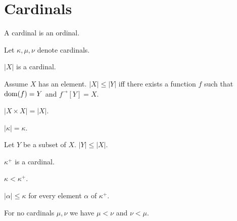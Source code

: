 \documentclass{article}
\newcommand{\Prod}[2]{#1\times #2}
\newcommand{\Succ}[1]{#1^{+}}
\newcommand{\image}[2]{#1^{\to}[#2]}
\newcommand{\card}[1]{\left|#1\right|}
\begin{document}
  \section{Cardinals}

  \begin{forthel}
    \begin{signature}
      A cardinal is an ordinal.
    \end{signature}

    Let $\kappa, \mu, \nu$ denote cardinals.
  \end{forthel}

  \begin{forthel}
    \begin{signature}[Cardinality]
      $\card{X}$ is a cardinal.
    \end{signature}

    \begin{axiom}
      Assume $X$ has an element.
      $\card{X} \leq \card{Y}$ iff
        there exists a function $f$ such that
          $\operatorname{dom}(f) = Y$ and $\image{f}{Y} = X$.
    \end{axiom}

    \begin{axiom}
      $\card{\Prod{X}{X}} = \card{X}$.
    \end{axiom}

    \begin{axiom}
      $\card{\kappa} = \kappa$.
    \end{axiom}

    \begin{axiom}
      Let $Y$ be a subset of $X$. $\card{Y} \leq \card{X}$.
    \end{axiom}

    \begin{signature}
      $\Succ{\kappa}$ is a cardinal.
    \end{signature}

    \begin{axiom}
      $\kappa < \Succ{\kappa}$.
    \end{axiom}

    \begin{axiom}
      $\card{\alpha} \leq \kappa$ for every element $\alpha$ of $\Succ{\kappa}$.
    \end{axiom}

    \begin{axiom}
      For no cardinals $\mu, \nu$ we have $\mu < \nu$ and $\nu < \mu$.
    \end{axiom}


\end{forthel}
\end{document}
